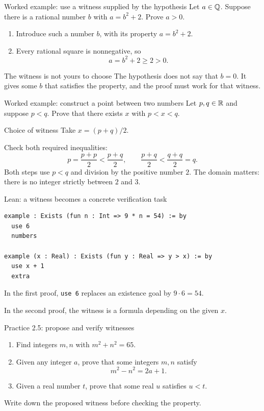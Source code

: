 \begin{frame}{Worked example: use a witness supplied by the hypothesis}
Let $a\in\mathbb{Q}$. Suppose there is a rational number $b$ with $a=b^2+2$.
Prove $a>0$.
\begin{enumerate}
\item Introduce such a number $b$, with its property $a=b^2+2$.
\item Every rational square is nonnegative, so
\[
a=b^2+2\ge2>0.
\]
\end{enumerate}
\begin{block}{The witness is not yours to choose}
The hypothesis does not say that $b=0$.
It gives some $b$ that satisfies the property, and the proof must work for that witness.
\end{block}
\end{frame}

\begin{frame}{Worked example: construct a point between two numbers}
Let $p,q\in\mathbb{R}$ and suppose $p<q$. Prove that there exists $x$ with $p<x<q$.
\begin{block}{Choice of witness}
Take $x=(p+q)/2$.
\end{block}
Check both required inequalities:
\[
p=\frac{p+p}{2}<\frac{p+q}{2},
\qquad
\frac{p+q}{2}<\frac{q+q}{2}=q.
\]
Both steps use $p<q$ and division by the positive number $2$.
The domain matters: there is no integer strictly between $2$ and $3$.
\end{frame}

\begin{frame}[fragile]{Lean: a witness becomes a concrete verification task}
\begin{lstlisting}
example : Exists (fun n : Int => 9 * n = 54) := by
  use 6
  numbers

example (x : Real) : Exists (fun y : Real => y > x) := by
  use x + 1
  extra
\end{lstlisting}
In the first proof, \texttt{use 6} replaces an existence goal by $9\cdot6=54$.

In the second proof, the witness is a formula depending on the given $x$.
\end{frame}

\begin{frame}{Practice 2.5: propose and verify witnesses}
\begin{enumerate}
\item Find integers $m,n$ with $m^2+n^2=65$.
\item Given any integer $a$, prove that some integers $m,n$ satisfy
\[
m^2-n^2=2a+1.
\]
\item Given a real number $t$, prove that some real $u$ satisfies $u<t$.
\end{enumerate}
Write down the proposed witness before checking the property.
\end{frame}

